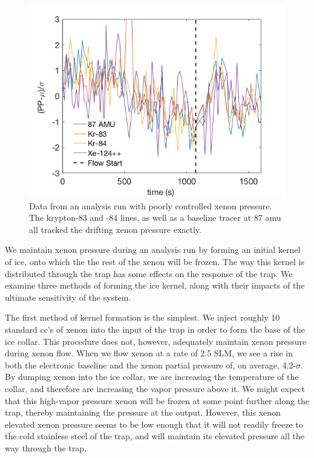 \documentclass[12pt]{article}
\begin{document}
\begin{figure}[h!]
\centering
\includegraphics[width=\textwidth]{Figures/RGA_noise_correlation.png}
\caption{Data from an analysis run with poorly controlled xenon pressure. The krypton-83 and -84 lines, as well as a baseline tracer at 87 amu all tracked the drifting xenon pressure exactly. } 
\label{fig:correlatednoise}
\end{figure} 

We maintain xenon pressure during an analysis run by forming an initial kernel of ice, onto which the the rest of the xenon will be frozen. The way this kernel is distributed through the trap has some effects on the response of the trap. We examine three methods of forming the ice kernel, along with their impacts of the ultimate sensitivity of the system. 

The first method of kernel formation is the simplest. We inject roughly 10 standard cc's of xenon into the input of the trap in order to form the base of the ice collar. This procedure does not, however, adequately maintain xenon pressure during xenon flow. When we flow xenon at a rate of 2.5 SLM, we see a rise in both the electronic baseline and the xenon partial pressure of, on average, 4.2-$\sigma$. By dumping xenon into the ice collar, we are increasing the temperature of the collar, and therefore are increasing the vapor pressure above it. We might expect that this high-vapor pressure xenon will be frozen at some point further along the trap, thereby maintaining the pressure at the output. However, this xenon elevated xenon pressure seems to be low enough that it will not readily freeze to the cold stainless steel of the trap, and will maintain its elevated pressure all the way through the trap.
\end{document}
